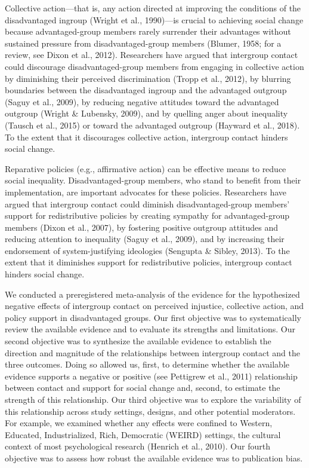 \documentclass[twocolumn, 11pt, letterpaper]{article}
\begin{document}
Collective action---that is, any action directed at improving the
conditions of the disadvantaged ingroup (Wright et al., 1990)---is
crucial to achieving social change because advantaged-group members
rarely surrender their advantages without sustained pressure from
disadvantaged-group members (Blumer, 1958; for a review, see Dixon et
al., 2012). Researchers have argued that intergroup contact could
discourage disadvantaged-group members from engaging in collective
action by diminishing their perceived discrimination (Tropp et al.,
2012), by blurring boundaries between the disadvantaged ingroup and the
advantaged outgroup (Saguy et al., 2009), by reducing negative attitudes
toward the advantaged outgroup (Wright \& Lubensky, 2009), and by
quelling anger about inequality (Tausch et al., 2015) or toward the
advantaged outgroup (Hayward et al., 2018). To the extent that it
discourages collective action, intergroup contact hinders social change.

Reparative policies (e.g., affirmative action) can be effective means to
reduce social inequality. Disadvantaged-group members, who stand to
benefit from their implementation, are important advocates for these
policies. Researchers have argued that intergroup contact could diminish
disadvantaged-group members' support for redistributive policies by
creating sympathy for advantaged-group members (Dixon et al., 2007), by
fostering positive outgroup attitudes and reducing attention to
inequality (Saguy et al., 2009), and by increasing their endorsement of
system-justifying ideologies (Sengupta \& Sibley, 2013). To the extent
that it diminishes support for redistributive policies, intergroup
contact hinders social change.

We conducted a preregistered meta-analysis of the evidence for the
hypothesized negative effects of intergroup contact on perceived
injustice, collective action, and policy support in disadvantaged
groups. Our first objective was to systematically review the available
evidence and to evaluate its strengths and limitations. Our second
objective was to synthesize the available evidence to establish the
direction and magnitude of the relationships between intergroup contact
and the three outcomes. Doing so allowed us, first, to determine whether
the available evidence supports a negative or positive (see Pettigrew et
al., 2011) relationship between contact and support for social change
and, second, to estimate the strength of this relationship. Our third
objective was to explore the variability of this relationship across
study settings, designs, and other potential moderators. For example, we
examined whether any effects were confined to Western, Educated,
Industrialized, Rich, Democratic (WEIRD) settings, the cultural context
of most psychological research (Henrich et al., 2010). Our fourth
objective was to assess how robust the available evidence was to
publication bias.
\end{document}
